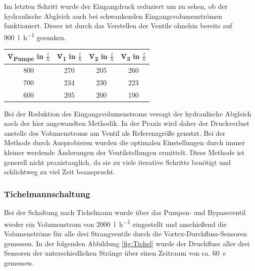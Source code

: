 Im letzten Schritt wurde der Eingangdruck reduziert um zu sehen, ob der hydraulische Abgleich auch bei schwankenden Eingangsvolumenströmen funktioniert. Dieser ist durch das Verstellen der Ventile ohnehin bereits auf \SI{900}{\litre\per\hour} gesunken.

\begin{center}
	\begin{tabular}{c|c|c|c}
		\label{tab:komp2}
		
		\textbf{\.V\textsubscript{Pumpe}} in $\frac{l}{h}$ & \textbf{\.V\textsubscript{1}} in $\frac{l}{h}$ & \textbf{\.V\textsubscript{2}} in $\frac{l}{h}$ & \textbf{\.V\textsubscript{3}} in $\frac{l}{h}$\\
		\hline
		800 & 270 & 205 & 260\\
		700 & 234 & 230 & 223\\
		600 & 205 & 200 & 190\\
	\end{tabular}
\end{center}

Bei der Reduktion des Eingangsvolumenstroms versagt der hydraulische Abgleich nach der hier angewandten Methodik. In der Praxis wird daher der Druckverlust anstelle des Volumenstroms am Ventil als Referenzgröße genutzt. Bei der Methode durch Ausprobieren wurden die optimalen Einstellungen durch immer kleiner werdende Änderungen der Ventilstellungen ermittelt. Diese Methode ist generell nicht praxistauglich, da sie zu viele iterative Schritte benötigt und schlichtweg zu viel Zeit beansprucht.

\subsubsection{Tichelmannschaltung}

Bei der Schaltung nach Tichelmann wurde über das Pumpen- und Bypassventil wieder ein Volumenstrom von \SI{2000}{\litre\per\hour} eingestellt und anschießend die Volumenströme für alle drei Strangventile durch die Vortex-Durchfluss-Sensoren gemessen. In der folgenden Abbildung \ref{fig:Tichel} wurde der Druchfluss aller drei Sensoren der unterschiedlichen Stränge über einen Zeitraum von ca. \SI{60}{\second} gemessen.

